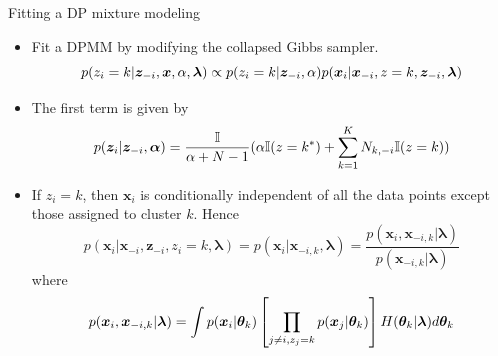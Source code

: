 \documentclass[10pt,mathserif]{beamer}
\begin{document}
\begin{frame}{Fitting a DP mixture modeling}
\begin{itemize}
    \item Fit a DPMM by modifying the collapsed Gibbs sampler.
    \begin{equation*}\small
        p(z_i = k|\bm{z}_{-i}, \bm{x}, \alpha, \bm{\lambda}) \propto p(z_i = k|\bm{z}_{-i}, \alpha)p(\bm{x}_i|\bm{x}_{-i}, z=k, \bm{z}_{-i}, \bm{\lambda})
    \end{equation*}
    \item The first term is given by
    \begin{equation*}\small
        p(\bm{z}_i|\bm{z}_{-i},\bm{\alpha})= \frac{\mathbb{I}}{\alpha+N-1} (\alpha \mathbb{I}(z=k^*)+ \sum_{k=1}^K N_{k,-i} \mathbb{I} (z=k) )
    \end{equation*}
    \item If $z_i = k$, then $\bm{x}_i$ is conditionally independent of all the data points except those assigned to cluster $k$. Hence 
    \begin{equation*}
        p(\bm{x}_i|\bm{x}_{-i}, \bm{z}_{-i}, z_i = k, \bm{\lambda}) = p(\bm{x}_i|\bm{x}_{-i,k}, \bm{\lambda}) = \frac{p(\bm{x}_i,\bm{x}_{-i,k}|\bm{\lambda})}{p(\bm{x}_{-i,k}|\bm{\lambda})}
    \end{equation*}
    where
    \begin{equation*}\small
        p(\bm{x}_i,\bm{x}_{-i,k}|\bm{\lambda}) = \int p(\bm{x}_i|\bm{\theta}_k) \left[\prod_{j \neq i, z_j = k} p(\bm{x}_j|\bm{\theta}_k)\right]H(\bm{\theta}_k|\bm{\lambda})d\bm{\theta} _k    
    \end{equation*}
\end{itemize}    
\end{frame}
\end{document}
